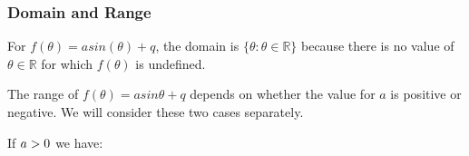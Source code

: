             \subsubsection{ Domain and Range}
            \nopagebreak
          \label{m39414*id85450}For $f\left(\theta \right)=asin\left(\theta \right)+q$, the domain is $\{\theta :\theta \in \mathbb{R}\}$ because there is no value of $\theta \in \mathbb{R}$ for which $f\left(\theta \right)$ is undefined.\par 
          \label{m39414*id85550}The range of $f\left(\theta \right)=asin\theta +q$ depends on whether the value for $a$ is positive or negative. We will consider these two cases separately.\par 
          \label{m39414*id85596}If $a>{}0$ we have:\par 
          \label{m39414*id85612}\nopagebreak\noindent{}

